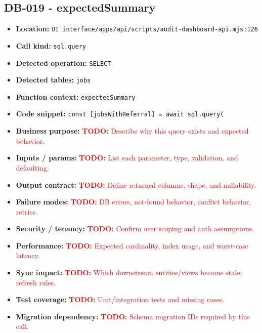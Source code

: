 \documentclass[11pt]{article}
\newcommand{\todoitem}[1]{\textcolor{red}{\textbf{TODO:} #1}}
\begin{document}
\subsection{DB-019 - expectedSummary}
\begin{itemize}[leftmargin=1.5em]
\item \textbf{Location:} \texttt{UI interface/apps/api/scripts/audit-dashboard-api.mjs:126}
\item \textbf{Call kind:} \texttt{sql.query}
\item \textbf{Detected operation:} \texttt{SELECT}
\item \textbf{Detected tables:} \texttt{jobs}
\item \textbf{Function context:} \texttt{expectedSummary}
\item \textbf{Code snippet:} \texttt{const [jobsWithReferral] = await sql.query(}
\item \textbf{Business purpose:} \todoitem{Describe why this query exists and expected behavior.}
\item \textbf{Inputs / params:} \todoitem{List each parameter, type, validation, and defaulting.}
\item \textbf{Output contract:} \todoitem{Define returned columns, shape, and nullability.}
\item \textbf{Failure modes:} \todoitem{DB errors, not-found behavior, conflict behavior, retries.}
\item \textbf{Security / tenancy:} \todoitem{Confirm user scoping and auth assumptions.}
\item \textbf{Performance:} \todoitem{Expected cardinality, index usage, and worst-case latency.}
\item \textbf{Sync impact:} \todoitem{Which downstream entities/views become stale; refresh rules.}
\item \textbf{Test coverage:} \todoitem{Unit/integration tests and missing cases.}
\item \textbf{Migration dependency:} \todoitem{Schema migration IDs required by this call.}
\end{itemize}
\end{document}
